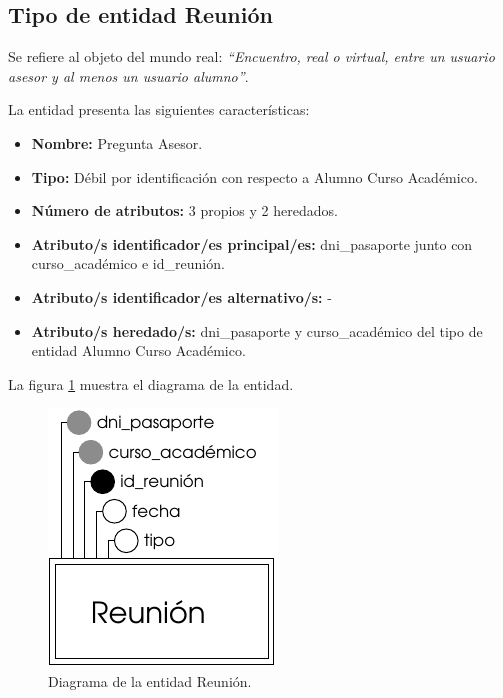 \subsection{Tipo de entidad Reunión}

   \begin{description}

   \item[Definición] Se refiere al objeto del mundo real: \emph{``Encuentro,
   real o virtual, entre un usuario asesor y al menos un usuario alumno''}.

   \item[Características] La entidad presenta las siguientes características:
      \begin{itemize}
         \item \textbf{Nombre:} Pregunta Asesor.
         \item \textbf{Tipo:} Débil por identificación con respecto a
         Alumno Curso Académico.
         \item \textbf{Número de atributos:} 3 propios y 2 heredados.
         \item \textbf{Atributo/s identificador/es principal/es:} dni\_pasaporte
         junto con curso\_académico e id\_reunión.
         \item \textbf{Atributo/s identificador/es alternativo/s:} -
         \item \textbf{Atributo/s heredado/s:} dni\_pasaporte y curso\_académico
         del tipo de entidad Alumno Curso Académico.
      \end{itemize}

   \item[Diagrama] La figura \ref{diagramaReunion} muestra el diagrama de la entidad.
   \item \begin{figure}[!ht]
            \begin{center}
            \includegraphics[]{07.Modelo_Entidad-Interrelacion/7.2.Analisis_Entidades/diagramas/reunion.pdf}
            \caption{Diagrama de la entidad Reunión.}
            \label{diagramaReunion}
            \end{center}
         \end{figure}


\end{description}
